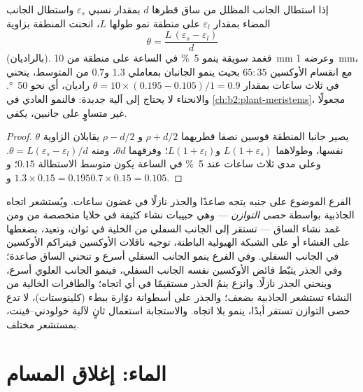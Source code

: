 \begin{theorem}\label{thm:b2:plant-plasticity:bend}
إذا استطال الجانب المظلل من ساق قطرها $d$ بمقدار نسبي
$\varepsilon_s$ واستطال الجانب المضاء بمقدار $\varepsilon_l$ على
منطقة نمو طولها $L$، انحنت المنطقة بزاوية
\[
\theta = \frac{L\,(\varepsilon_s - \varepsilon_l)}{d}
\]
(بالراديان). فغمد سويقة ينمو \qty{5}{\%} في الساعة على
منطقة من \qty{10}{mm} وعرضه \qty{1}{mm}، مع انقسام الأوكسين
$65 : 35$ بحيث ينمو الجانبان بمعاملي $1.3$ و$0.7$ من
المتوسط، ينحني في ثلاث ساعات بمقدار $\theta = 10\times(0.195 - 0.105)/1 =
0.9$ راديان، أي نحو \qty{50}{\degree}. والانحناء لا يحتاج إلى آلية
جديدة: فالنمو العادي في \cref{ch:b2:plant-meristems}، مجعولًا
غير متساوٍ على جانبين، يكفي.
\end{theorem}
\begin{proof}
يصير جانبا المنطقة قوسين نصفا قطريهما $\rho + d/2$ و
$\rho - d/2$ يقابلان الزاوية $\theta$ نفسها، وطولاهما $L(1 +
\varepsilon_s)$ و$L(1 + \varepsilon_l)$؛ وفرقهما
$\theta d$، ومنه $\theta = L(\varepsilon_s - \varepsilon_l)/d$. وعلى مدى
ثلاث ساعات عند \qty{5}{\%} في الساعة يكون متوسط الاستطالة $0.15$؛
و$1.3\times 0.15 = 0.195$ و$0.7\times 0.15 = 0.105$.
\end{proof}

\begin{proposition}\label{prop:b2:plant-plasticity:gravitropism}
الفرع الموضوع على جنبه يتجه صاعدًا والجذر نازلًا في غضون
ساعات. ويُستشعر اتجاه الجاذبية بواسطة \emph{حصى التوازن} ---
وهي حبيبات نشاء كثيفة في خلايا متخصصة من  ومن
غمد نشاء الساق --- تستقر إلى الجانب السفلي من الخلية
في ثوان، وتعيد، بضغطها على الغشاء أو على الشبكة
الهيولية الباطنة، توجيه ناقلات الأوكسين فيتراكم الأوكسين
في الجانب السفلي. وفي الفرع ينمو الجانب السفلي أسرع و
تنحني الساق صاعدة؛ وفي الجذر يثبّط فائض الأوكسين نفسه الجانب
السفلي، فينمو الجانب العلوي أسرع، وينحني الجذر نازلًا. وانزع
 ينمُ الجذر مستقيمًا في أي اتجاه؛ والطافرات الخالية
من النشاء تستشعر الجاذبية بضعف؛ والجذر على أسطوانة دوّارة ببطء
(كلينوستات)، لا تدع حصى التوازن تستقر أبدًا، ينمو
بلا اتجاه. والاستجابة استعمال ثانٍ لآلية
خولودني--فينت، بمستشعر مختلف.
\end{proposition}

\section{الماء: إغلاق المسام}


